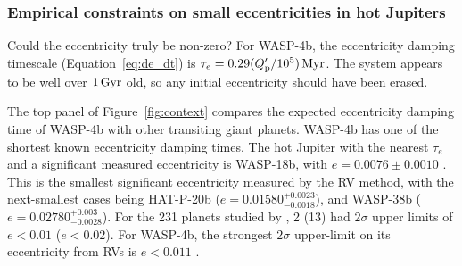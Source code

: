 \documentclass[12pt,twocolumn,tighten]{aastex62}
\begin{document}
\subsubsection{Empirical constraints on small eccentricities in hot
Jupiters}

Could the eccentricity truly be non-zero?  For WASP-4b, the eccentricity
damping timescale (Equation~\ref{eq:de_dt}) is $\tau_e = 0.29 (Q_{\rm
p}'/10^5) \, {\rm Myr}$.  The system appears to be well over $1\,{\rm
Gyr}$ \citep{winn_transit_2009} old, so any initial eccentricity should
have been erased.

The top panel of Figure~\ref{fig:context} compares the expected
eccentricity damping time of WASP-4b with other transiting giant
planets.  WASP-4b has one of the shortest known eccentricity damping
times.  The hot Jupiter with the nearest $\tau_e$ and a significant
measured eccentricity is WASP-18b, with $e = 0.0076 \pm 0.0010$
\citep{triaud_spin-orbit_2010,bonomo_gaps_2017}.  This is the smallest
significant eccentricity measured by the RV method, with the
next-smallest cases being HAT-P-20b ($e =
0.01580^{+0.0023}_{-0.0018}$), and WASP-38b ($e =
0.02780^{+0.003}_{-0.0028}$).  For the 231 planets studied by
\citet{bonomo_gaps_2017}, 2 (13) had $2\sigma$ upper limits of $e <
0.01$ ($e<0.02$).  For WASP-4b, the strongest $2\sigma$ upper-limit on
its eccentricity from RVs is $e<0.011$
\citep{husnoo_observational_2012,bonomo_gaps_2017}.  
\end{document}
